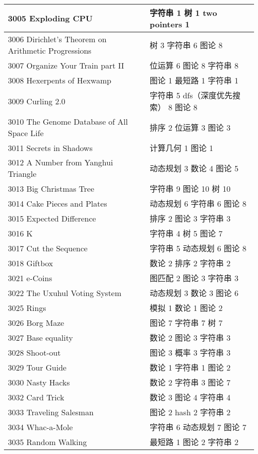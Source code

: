 \begin{longtable}{| p{} | p{} |}
 3005 Exploding CPU  & 字符串 1 树 1 two pointers 1 \\ \hline
 3006 Dirichlet's Theorem on Arithmetic Progressions  & 树 3 字符串 6 图论 8 \\ \hline
 3007 Organize Your Train part II  & 位运算 6 图论 8 字符串 8 \\ \hline
 3008 Hexerpents of Hexwamp  & 图论 1 最短路 1 字符串 1 \\ \hline
 3009 Curling 2.0  & 字符串 5 dfs（深度优先搜索） 8 图论 8 \\ \hline
 3010 The Genome Database of All Space Life  & 排序 2 位运算 3 图论 3 \\ \hline
 3011 Secrets in Shadows  & 计算几何 1 图论 1 \\ \hline
 3012 A Number from Yanghui Triangle  & 动态规划 3 数论 4 图论 5 \\ \hline
 3013 Big Christmas Tree  & 字符串 9 图论 10 树 10 \\ \hline
 3014 Cake Pieces and Plates  & 动态规划 6 字符串 6 图论 8 \\ \hline
 3015 Expected Difference  & 排序 2 图论 3 字符串 3 \\ \hline
 3016 K  & 字符串 4 树 5 图论 7 \\ \hline
 3017 Cut the Sequence  & 字符串 5 动态规划 6 图论 8 \\ \hline
 3018 Giftbox  & 数论 2 排序 2 字符串 2 \\ \hline
 3021 e-Coins  & 图匹配 2 图论 3 字符串 3 \\ \hline
 3022 The Uxuhul Voting System  & 动态规划 3 数论 3 图论 6 \\ \hline
 3025 Rings  & 模拟 1 数论 1 图论 2 \\ \hline
 3026 Borg Maze  & 图论 7 字符串 7 树 7 \\ \hline
 3027 Base equality  & 数论 2 图论 3 字符串 3 \\ \hline
 3028 Shoot-out  & 图论 3 概率 3 字符串 3 \\ \hline
 3029 Tour Guide  & 数论 1 字符串 1 图论 2 \\ \hline
 3030 Nasty Hacks  & 数论 2 字符串 3 图论 7 \\ \hline
 3032 Card Trick  & 数论 3 图论 4 字符串 4 \\ \hline
 3033 Traveling Salesman  & 图论 2 hash 2 字符串 2 \\ \hline
 3034 Whac-a-Mole  & 字符串 6 动态规划 7 图论 7 \\ \hline
 3035 Random Walking  & 最短路 1 图论 2 字符串 2 \\ \hline

\end{longtable}
